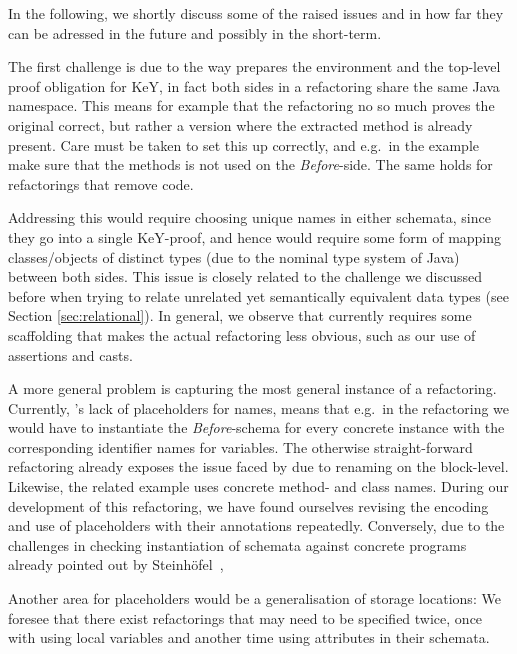 In the following, we shortly discuss some of the raised issues and in how far they can be adressed in the future and possibly in the short-term.

The first challenge is due to the way \Refinity{} prepares the environment and the top-level proof obligation for KeY,
in fact both sides in a refactoring share the same Java namespace.
This means for example that the  refactoring no so much proves the original correct, but rather a version where the extracted method is already present.
Care must be taken to set this up correctly, and e.g.\ in the  example make sure that the methods is not used on the \textit{Before}-side.
The same holds for refactorings that remove code.

Addressing this would require choosing unique names in either schemata, since they go into a single KeY-proof, and hence would require some form of mapping classes/objects of distinct types (due to the nominal type system of Java) between both sides.
This issue is closely related to the challenge we discussed before when trying to relate unrelated yet semantically equivalent data types (see Section \ref{sec:relational}).
In general, we observe that currently \Refinity{} requires some scaffolding that makes the actual refactoring less obvious,
such as our use of assertions and casts.

A more general problem is capturing the most general instance of a refactoring.
Currently, \Refinity{}'s lack of placeholders for names, means that e.g.\ in the  refactoring we would have to instantiate the \textit{Before}-schema for every concrete instance with the corresponding identifier names for variables.
The otherwise straight-forward refactoring  already exposes the issue faced by \Refinity{} due to renaming on the block-level.
Likewise, the related  example uses concrete method- and class names.
During our development of this refactoring, we have found ourselves revising the encoding and use of placeholders with their annotations repeatedly.
Conversely, due to the challenges in checking instantiation of schemata against concrete programs already pointed out by Steinhöfel~\cite[119,137]{steinhoefel-20},

Another area for placeholders would be a generalisation of storage locations:
We foresee that there exist refactorings that may need to be specified twice, once with using local variables and another time using attributes in their schemata.

